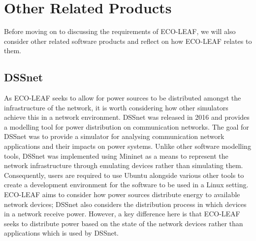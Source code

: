 \documentclass{l4proj}
\begin{document}
\section{Other Related Products}
Before moving on to discussing the requirements of ECO-LEAF, we will also consider other related software products and reflect on how ECO-LEAF relates to them.
\subsection{DSSnet}
As ECO-LEAF seeks to allow for power sources to be distributed amongst the infrastructure of the network, it is worth considering how other simulators achieve this in a network environment.
DSSnet \citep{dssNet} was released in 2016 and provides a modelling tool for power distribution on communication networks.
The goal for DSSnet was to provide a simulator for analysing communication network applications and their impacts on power systems.
Unlike other software modelling tools, DSSnet was implemented using Mininet \citep{mininet} as a means to represent the network infrastructure through emulating devices rather than simulating them.
Consequently, users are required to use Ubuntu alongside various other tools to create a development environment for the software to be used in a Linux setting.
ECO-LEAF aims to consider how power sources distribute energy to available network devices; DSSnet also considers the distribution process in which devices in a network receive power.
However, a key difference here is that ECO-LEAF seeks to distribute power based on the state of the network devices rather than applications which is used by DSSnet.
\end{document}
